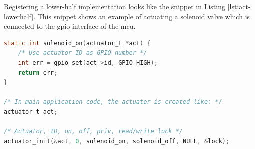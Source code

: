Registering a lower-half implementation looks like the snippet in Listing \ref{lst:act-lowerhalf}. This snippet shows
an example of actuating a solenoid valve which is connected to the \gls{gpio} interface of the \gls{mcu}.

\begin{lstlisting}[caption={Actuator lower-half implementation example}, label={lst:act-lowerhalf}, language={C}]
static int solenoid_on(actuator_t *act) {
    /* Use actuator ID as GPIO number */
    int err = gpio_set(act->id, GPIO_HIGH);
    return err;
}

/* In main application code, the actuator is created like: */
actuator_t act;

/* Actuator, ID, on, off, priv, read/write lock */
actuator_init(&act, 0, solenoid_on, solenoid_off, NULL, &lock);
\end{lstlisting}
